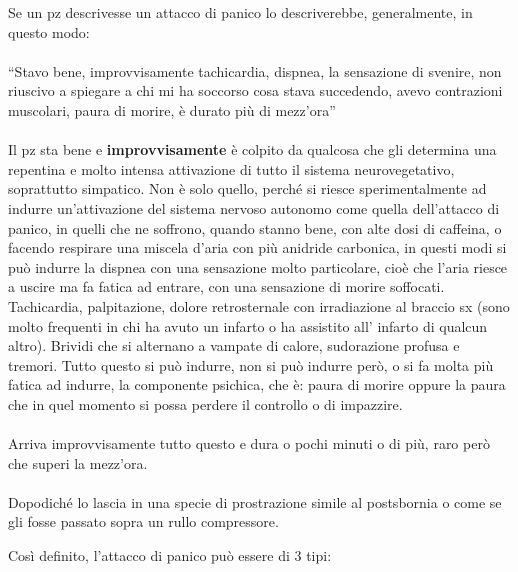 Se un pz descrivesse un attacco di panico lo descriverebbe,
generalmente, in questo modo:
\\\\
``Stavo bene, improvvisamente tachicardia, dispnea, la sensazione di
svenire, non riuscivo a spiegare a chi mi ha soccorso cosa stava
succedendo, avevo contrazioni muscolari, paura di morire, è durato più
di mezz'ora''
\\\\
Il pz sta bene e \textbf{improvvisamente} è colpito da qualcosa che gli
determina una repentina e molto intensa attivazione di tutto il sistema
neurovegetativo, soprattutto simpatico. Non è solo quello, perché si
riesce sperimentalmente ad indurre un'attivazione del sistema nervoso
autonomo come quella dell'attacco di panico, in quelli che ne soffrono,
quando stanno bene, con alte dosi di caffeina, o facendo respirare una
miscela d'aria con più anidride carbonica, in questi modi si può indurre
la dispnea con una sensazione molto particolare, cioè che l'aria riesce
a uscire ma fa fatica ad entrare, con una sensazione di morire
soffocati. Tachicardia, palpitazione, dolore retrosternale con
irradiazione al braccio sx (sono molto frequenti in chi ha avuto un
infarto o ha assistito all' infarto di qualcun altro). Brividi che si
alternano a vampate di calore, sudorazione profusa e tremori. Tutto
questo si può indurre, non si può indurre però, o si fa molta più fatica
ad indurre, la componente psichica, che è: paura di morire oppure la
paura che in quel momento si possa perdere il controllo o di impazzire.
\\\\
Arriva improvvisamente tutto questo e dura o pochi minuti o di più, raro
però che superi la mezz'ora.
\\\\
Dopodiché lo lascia in una specie di prostrazione simile al postsbornia
o come se gli fosse passato sopra un rullo compressore.

Così definito, l'attacco di panico può essere di 3 tipi:

